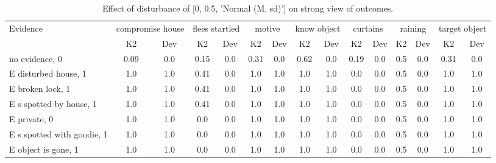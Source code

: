 \begin{table}\begin{tabular}{l|cc|cc|cc|cc|cc|cc|cc}\toprule\multirow{2}{*}{Evidence} & \multicolumn{2}{c}{compromise house}& \multicolumn{2}{c}{flees startled}& \multicolumn{2}{c}{motive}& \multicolumn{2}{c}{know object}& \multicolumn{2}{c}{curtains}& \multicolumn{2}{c}{raining}& \multicolumn{2}{c}{target object}\\& {K2} & {Dev}& {K2} & {Dev}& {K2} & {Dev}& {K2} & {Dev}& {K2} & {Dev}& {K2} & {Dev}& {K2} & {Dev}\\\midrule
no evidence, 0 & \cellcolor{Bittersweet}0.09&\cellcolor{Bittersweet}0.0&\cellcolor{Bittersweet}0.15&\cellcolor{Bittersweet}0.0&\cellcolor{Bittersweet}0.31&\cellcolor{Bittersweet}0.0&\cellcolor{Bittersweet}0.62&\cellcolor{Bittersweet}0.0&\cellcolor{Bittersweet}0.19&\cellcolor{Bittersweet}0.0&0.5&0.0&0.31&0.0\\E disturbed house, 1 & \cellcolor{Bittersweet}1.0&\cellcolor{Bittersweet}1.0&0.41&0.0&\cellcolor{Bittersweet}1.0&\cellcolor{Bittersweet}1.0&\cellcolor{Bittersweet}1.0&\cellcolor{Bittersweet}1.0&\cellcolor{Bittersweet}0.0&\cellcolor{Bittersweet}0.0&0.5&0.0&\cellcolor{Bittersweet}1.0&\cellcolor{Bittersweet}1.0\\E broken lock, 1 & \cellcolor{Bittersweet}1.0&\cellcolor{Bittersweet}1.0&0.41&0.0&\cellcolor{Bittersweet}1.0&\cellcolor{Bittersweet}1.0&\cellcolor{Bittersweet}1.0&\cellcolor{Bittersweet}1.0&\cellcolor{Bittersweet}0.0&\cellcolor{Bittersweet}0.0&0.5&0.0&\cellcolor{Bittersweet}1.0&\cellcolor{Bittersweet}1.0\\E s spotted by house, 1 & \cellcolor{Bittersweet}1.0&\cellcolor{Bittersweet}1.0&0.41&0.0&\cellcolor{Bittersweet}1.0&\cellcolor{Bittersweet}1.0&\cellcolor{Bittersweet}1.0&\cellcolor{Bittersweet}1.0&\cellcolor{Bittersweet}0.0&\cellcolor{Bittersweet}0.0&0.5&0.0&\cellcolor{Bittersweet}1.0&\cellcolor{Bittersweet}1.0\\E private, 0 & \cellcolor{Bittersweet}1.0&\cellcolor{Bittersweet}1.0&\cellcolor{Bittersweet}0.0&\cellcolor{Bittersweet}0.0&\cellcolor{Bittersweet}1.0&\cellcolor{Bittersweet}1.0&\cellcolor{Bittersweet}1.0&\cellcolor{Bittersweet}1.0&\cellcolor{Bittersweet}0.0&\cellcolor{Bittersweet}0.0&0.5&0.0&\cellcolor{Bittersweet}1.0&\cellcolor{Bittersweet}1.0\\E s spotted with goodie, 1 & \cellcolor{Bittersweet}1.0&\cellcolor{Bittersweet}1.0&\cellcolor{Bittersweet}0.0&\cellcolor{Bittersweet}0.0&\cellcolor{Bittersweet}1.0&\cellcolor{Bittersweet}1.0&\cellcolor{Bittersweet}1.0&\cellcolor{Bittersweet}1.0&\cellcolor{Bittersweet}0.0&\cellcolor{Bittersweet}0.0&0.5&0.0&\cellcolor{Bittersweet}1.0&\cellcolor{Bittersweet}1.0\\E object is gone, 1 & \cellcolor{Bittersweet}1.0&\cellcolor{Bittersweet}1.0&\cellcolor{Bittersweet}0.0&\cellcolor{Bittersweet}0.0&\cellcolor{Bittersweet}1.0&\cellcolor{Bittersweet}1.0&\cellcolor{Bittersweet}1.0&\cellcolor{Bittersweet}1.0&\cellcolor{Bittersweet}0.0&\cellcolor{Bittersweet}0.0&0.5&0.0&\cellcolor{Bittersweet}1.0&\cellcolor{Bittersweet}1.0\\\bottomrule\end{tabular}\caption{Effect of disturbance of [0, 0.5, 'Normal (M, sd)'] on strong view of outcomes.}\end{table}